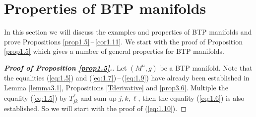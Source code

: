 \documentclass{amsart}
\numberwithin{equation}{section}
\theoremstyle{definition}
\renewcommand{\1}{\mathds{1}}
\renewcommand{\>}{\rightarrow}
\begin{document}
\section{Properties of BTP manifolds}\label{BTP_mfd}

In this section we will discuss the examples and properties of BTP manifolds and prove Propositions \ref{prop1.5}\,--\,\ref{cor1.11}.
We start with the proof of Proposition \ref{prop1.5} which gives a number of general properties for BTP manifolds.

\begin{proof}[{\bf Proof of Proposition \ref{prop1.5}.}]
Let $(M^n,g)$ be a BTP manifold. Note that the equalities (\ref{eq:1.5}) and (\ref{eq:1.7})\,--\,(\ref{eq:1.9})
have already been established in Lemma \ref{lemma3.1}, Propositions \ref{Tderivative} and \ref{prop3.6}.
Multiple the equality (\ref{eq:1.5}) by $\overline{T_{jk}^\ell}$ and sum up $j,k,\ell$, then the equality (\ref{eq:1.6}) is also established.
So we will start with the proof of (\ref{eq:1.10}).


\end{proof}
\end{document}
